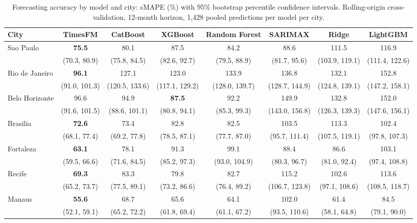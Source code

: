 \begin{table}[htbp]
\centering
\footnotesize
\setlength{\tabcolsep}{2.5pt}
\caption{Forecasting accuracy by model and city: sMAPE (\%) with 95\% bootstrap
percentile confidence intervals. Rolling-origin cross-validation, 12-month horizon,
1{,}428 pooled predictions per model per city.}
\label{tab:smape}
\begin{tabular}{lccccccc}
\toprule
City & TimesFM & CatBoost & XGBoost & Random Forest & SARIMAX & Ridge & LightGBM \\
\midrule
Sao Paulo & \textbf{75.5} & 80.1 & 87.5 & 84.2 & 88.6 & 111.5 & 116.9 \\
 & \tiny(70.3, 80.9) & \tiny(75.8, 84.5) & \tiny(82.6, 92.7) & \tiny(79.5, 88.9) & \tiny(81.7, 95.6) & \tiny(103.9, 119.1) & \tiny(111.4, 122.6) \\[2pt]
Rio de Janeiro & \textbf{96.1} & 127.1 & 123.0 & 133.9 & 136.8 & 132.1 & 152.8 \\
 & \tiny(91.0, 101.3) & \tiny(120.5, 133.6) & \tiny(117.1, 129.2) & \tiny(128.0, 139.7) & \tiny(128.7, 144.9) & \tiny(124.8, 139.1) & \tiny(147.2, 158.1) \\[2pt]
Belo Horizonte & 96.6 & 94.9 & \textbf{87.5} & 92.2 & 149.9 & 132.8 & 152.0 \\
 & \tiny(91.6, 101.5) & \tiny(88.6, 101.1) & \tiny(80.8, 94.1) & \tiny(85.3, 99.3) & \tiny(143.0, 156.8) & \tiny(126.3, 139.3) & \tiny(147.6, 156.1) \\[2pt]
Brasilia & \textbf{72.6} & 73.4 & 82.8 & 82.5 & 103.5 & 113.3 & 102.4 \\
 & \tiny(68.1, 77.4) & \tiny(69.2, 77.8) & \tiny(78.5, 87.1) & \tiny(77.7, 87.0) & \tiny(95.7, 111.4) & \tiny(107.5, 119.1) & \tiny(97.8, 107.3) \\[2pt]
Fortaleza & \textbf{63.1} & 78.1 & 91.3 & 99.1 & 88.4 & 86.6 & 103.1 \\
 & \tiny(59.5, 66.6) & \tiny(71.6, 84.5) & \tiny(85.2, 97.3) & \tiny(93.0, 104.9) & \tiny(80.3, 96.7) & \tiny(81.0, 92.4) & \tiny(97.4, 108.8) \\[2pt]
Recife & \textbf{69.3} & 83.3 & 79.8 & 82.7 & 115.2 & 102.6 & 113.6 \\
 & \tiny(65.2, 73.7) & \tiny(77.5, 89.1) & \tiny(73.2, 86.6) & \tiny(76.4, 89.2) & \tiny(106.7, 123.8) & \tiny(97.1, 108.6) & \tiny(108.5, 118.7) \\[2pt]
Manaus & \textbf{55.6} & 68.7 & 65.6 & 64.1 & 102.0 & 61.4 & 84.5 \\
 & \tiny(52.1, 59.1) & \tiny(65.2, 72.2) & \tiny(61.8, 69.4) & \tiny(61.1, 67.2) & \tiny(93.5, 110.6) & \tiny(58.1, 64.8) & \tiny(79.1, 90.0) \\[2pt]

\end{tabular}
\end{table}
